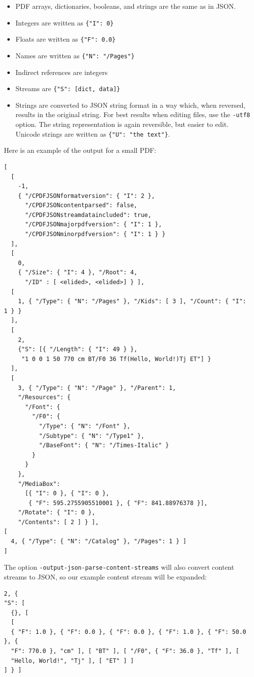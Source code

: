 \documentclass{book}
\begin{document}
\begin{itemize}
  \item PDF arrays, dictionaries, booleans, and strings are the same as in JSON.
  \item Integers are written as \texttt{\{"I":\ 0\}}
  \item Floats are written as \texttt{\{"F":\ 0.0\}}
  \item Names are written as \texttt{\{"N":\ "/Pages"\}}
  \item Indirect references are integers
  \item Streams are \texttt{\{"S":\ [dict, data]\}}
  \item Strings are converted to JSON string format in a way which, when reversed, results in the original string. For best results when editing files, use the \texttt{-utf8} option. The string representation is again reversible, but easier to edit. Unicode strings are written as \texttt{\{"U":\ "the text"\}}.
\end{itemize}

\noindent Here is an example of the output for a small PDF:

{\small\begin{verbatim}
[
  [
    -1,
    { "/CPDFJSONformatversion": { "I": 2 },
      "/CPDFJSONcontentparsed": false,
      "/CPDFJSONstreamdataincluded": true,
      "/CPDFJSONmajorpdfversion": { "I": 1 },
      "/CPDFJSONminorpdfversion": { "I": 1 } }
  ],
  [
    0,
    { "/Size": { "I": 4 }, "/Root": 4,
      "/ID" : [ <elided>, <elided>] } ],
  [
    1, { "/Type": { "N": "/Pages" }, "/Kids": [ 3 ], "/Count": { "I": 1 } }
  ],
  [
    2,
    {"S": [{ "/Length": { "I": 49 } },
     "1 0 0 1 50 770 cm BT/F0 36 Tf(Hello, World!)Tj ET"] }
  ],
  [
    3, { "/Type": { "N": "/Page" }, "/Parent": 1,
    "/Resources": {
      "/Font": {
        "/F0": {
          "/Type": { "N": "/Font" },
          "/Subtype": { "N": "/Type1" },
          "/BaseFont": { "N": "/Times-Italic" }
        }
      }
    },
    "/MediaBox":
      [{ "I": 0 }, { "I": 0 },
       { "F": 595.2755905510001 }, { "F": 841.88976378 }],
    "/Rotate": { "I": 0 },
    "/Contents": [ 2 ] } ],
[
  4, { "/Type": { "N": "/Catalog" }, "/Pages": 1 } ]
]\end{verbatim}}

\noindent The option \texttt{-output-json-parse-content-streams} will also convert content streams to JSON, so our example content stream will be expanded:


{\small\begin{verbatim}
2, {
"S": [
  {}, [
  [
  { "F": 1.0 }, { "F": 0.0 }, { "F": 0.0 }, { "F": 1.0 }, { "F": 50.0 }, {
  "F": 770.0 }, "cm" ], [ "BT" ], [ "/F0", { "F": 36.0 }, "Tf" ], [
  "Hello, World!", "Tj" ], [ "ET" ] ]
] } ]
\end{verbatim}}
\end{document}
